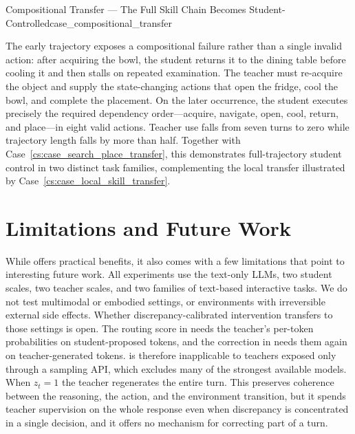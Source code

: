 \begin{case}{Compositional Transfer --- The Full Skill Chain Becomes Student-Controlled}{case_compositional_transfer}
\vspace{2.0em}
\begin{ageanalysisbox}
\footnotesize
The early trajectory exposes a compositional failure rather than a single
invalid action: after acquiring the bowl, the student returns it to the dining table before cooling it and then stalls on repeated examination. 
The teacher must re-acquire the object and supply the state-changing actions that open the fridge, cool the bowl, and complete the placement. 
On the later occurrence, the student executes precisely the required dependency order---acquire, navigate, open, cool, return, and place---in eight valid actions. 
Teacher use falls from seven turns to zero while trajectory length falls by more than half. 
Together with Case~\ref{cs:case_search_place_transfer}, this demonstrates full-trajectory student control in two distinct task families, complementing the local transfer illustrated by Case~\ref{cs:case_local_skill_transfer}.
\end{ageanalysisbox}
\end{case}





\section{Limitations and Future Work}
\label{app:limitations} 

While \name offers practical benefits, it also comes with a few limitations that point to interesting future work.
All experiments use the text-only LLMs, two student scales, two teacher scales, and two families of text-based interactive tasks. 
We do not test multimodal or embodied settings, or environments with irreversible external side effects. 
Whether discrepancy-calibrated intervention transfers to those settings is open.
The routing score in  needs the teacher's per-token probabilities on student-proposed tokens, and the correction in  needs them again on teacher-generated tokens. 
\name is therefore inapplicable to teachers exposed only through a sampling API, which excludes many of the strongest available models. 
When $z_t=1$ the teacher regenerates the entire turn. This preserves coherence between
the reasoning, the action, and the environment transition, but it spends teacher supervision on the whole response even when discrepancy is concentrated in a single decision, and it offers no mechanism for correcting part of a turn.

